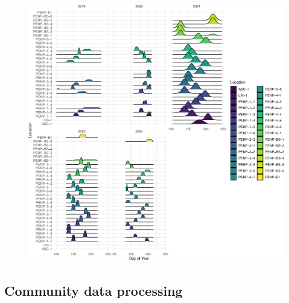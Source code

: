 \documentclass[
  letterpaper,
  DIV=11,
  numbers=noendperiod,
  oneside]{scrartcl}
\begin{document}
\begin{figure}


{\centering \includegraphics{peinp_files/figure-pdf/fig-recs-collect-1.pdf}

}

\end{figure}

\hypertarget{community-data-processing}{%
\subsection{Community data processing}\label{community-data-processing}}
\end{document}
